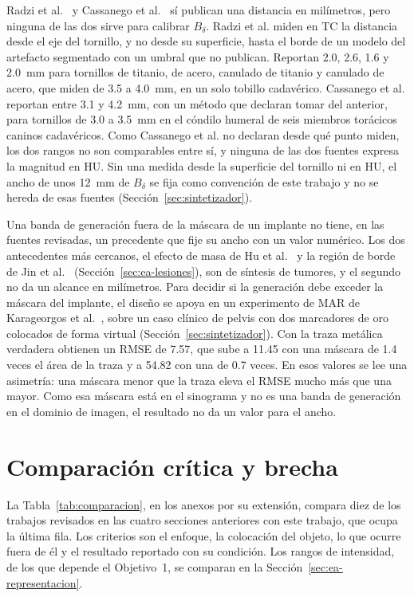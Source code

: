 Radzi et al.~\cite{radzi2014metalartifacts} y Cassanego et al.~\cite{cassanego2026evolution} sí publican una distancia en milímetros, pero ninguna de las dos sirve para calibrar $B_{\delta}$. Radzi et al. miden en TC la distancia desde el eje del tornillo, y no desde su superficie, hasta el borde de un modelo del artefacto segmentado con un umbral que no publican. Reportan 2.0, 2.6, 1.6 y 2.0~mm para tornillos de titanio, de acero, canulado de titanio y canulado de acero, que miden de 3.5 a 4.0~mm, en un solo tobillo cadavérico. Cassanego et al. reportan entre 3.1 y 4.2~mm, con un método que declaran tomar del anterior, para tornillos de 3.0 a 3.5~mm en el cóndilo humeral de seis miembros torácicos caninos cadavéricos. Como Cassanego et al. no declaran desde qué punto miden, los dos rangos no son comparables entre sí, y ninguna de las dos fuentes expresa la magnitud en HU. Sin una medida desde la superficie del tornillo ni en HU, el ancho de unos 12~mm de $B_{\delta}$ se fija como convención de este trabajo y no se hereda de esas fuentes (Sección~\ref{sec:sintetizador}).

Una banda de generación fuera de la máscara de un implante no tiene, en las fuentes revisadas, un precedente que fije su ancho con un valor numérico. Los dos antecedentes más cercanos, el efecto de masa de Hu et al.~\cite{hu2023} y la región de borde de Jin et al.~\cite{jin2021freetumor} (Sección~\ref{sec:ea-lesiones}), son de síntesis de tumores, y el segundo no da un alcance en milímetros. Para decidir si la generación debe exceder la máscara del implante, el diseño se apoya en un experimento de MAR de Karageorgos et al.~\cite{karageorgos2024ddpm}, sobre un caso clínico de pelvis con dos marcadores de oro colocados de forma virtual (Sección~\ref{sec:sintetizador}). Con la traza metálica verdadera obtienen un RMSE de 7.57, que sube a 11.45 con una máscara de 1.4 veces el área de la traza y a 54.82 con una de 0.7 veces. En esos valores se lee una asimetría: una máscara menor que la traza eleva el RMSE mucho más que una mayor. Como esa máscara está en el sinograma y no es una banda de generación en el dominio de imagen, el resultado no da un valor para el ancho.

\section{Comparación crítica y brecha}\label{sec:ea-brecha}

La Tabla~\ref{tab:comparacion}, en los anexos por su extensión, compara diez de los trabajos revisados en las cuatro secciones anteriores con este trabajo, que ocupa la última fila. Los criterios son el enfoque, la colocación del objeto, lo que ocurre fuera de él y el resultado reportado con su condición. Los rangos de intensidad, de los que depende el Objetivo~1, se comparan en la Sección~\ref{sec:ea-representacion}.

